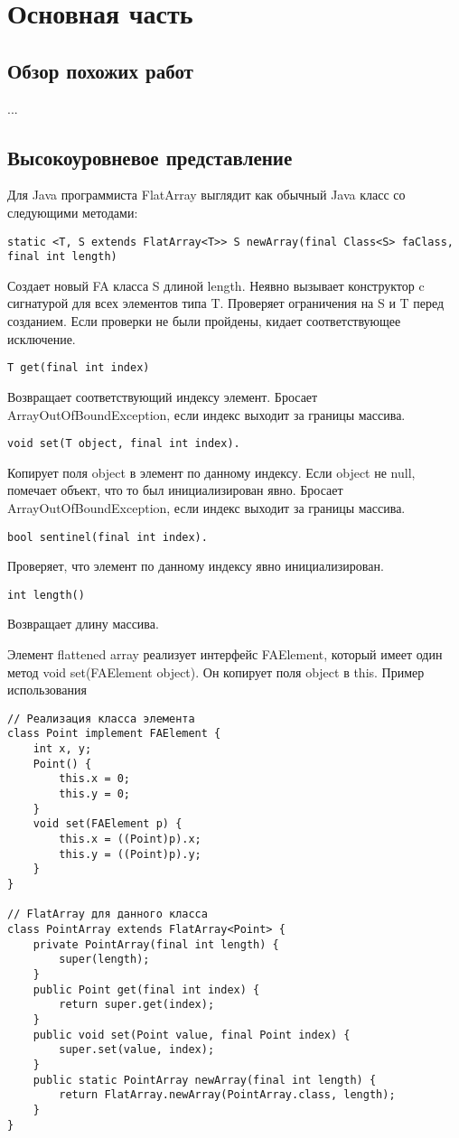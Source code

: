 \section{Основная часть}
\subsection{Обзор похожих работ}
	...
	
\subsection{Высокоуровневое представление}

Для Java программиста FlatArray выглядит как обычный Java класс со следующими методами:
\begin{lstlisting}
static <T, S extends FlatArray<T>> S newArray(final Class<S> faClass, final int length)
\end{lstlisting}
Создает новый FA класса S длиной length. Неявно вызывает конструктор c сигнатурой для всех элементов типа T. Проверяет ограничения на S и T перед созданием. Если проверки не были пройдены, кидает соответствующее исключение.
\begin{lstlisting}
T get(final int index)
\end{lstlisting}
Возвращает соответствующий индексу элемент. Бросает ArrayOutOfBoundException, если индекс выходит за границы массива.
\begin{lstlisting}
void set(T object, final int index).
\end{lstlisting}
Копирует поля object в элемент по данному индексу. Если object не null, помечает объект, что то был инициализирован явно. Бросает ArrayOutOfBoundException, если индекс выходит за границы массива.
\begin{lstlisting}
bool sentinel(final int index).
\end{lstlisting}
Проверяет, что элемент по данному индексу явно инициализирован.
\begin{lstlisting}
int length()
\end{lstlisting}
Возвращает длину массива. 
\par
Элемент flattened array реализует интерфейс FAElement, который имеет один метод void set(FAElement object). Он копирует поля object в this. 
Пример использования
\begin{lstlisting}
// Реализация класса элемента
class Point implement FAElement {
	int x, y;
	Point() {
		this.x = 0; 
		this.y = 0; 
	}
	void set(FAElement p) { 
		this.x = ((Point)p).x; 
		this.y = ((Point)p).y; 
	}
}

// FlatArray для данного класса
class PointArray extends FlatArray<Point> {
	private PointArray(final int length) { 
		super(length); 
	}
	public Point get(final int index) { 
		return super.get(index); 
	}
	public void set(Point value, final Point index) { 
		super.set(value, index); 
	}
	public static PointArray newArray(final int length) { 
		return FlatArray.newArray(PointArray.class, length); 
	}
}
\end{lstlisting}

